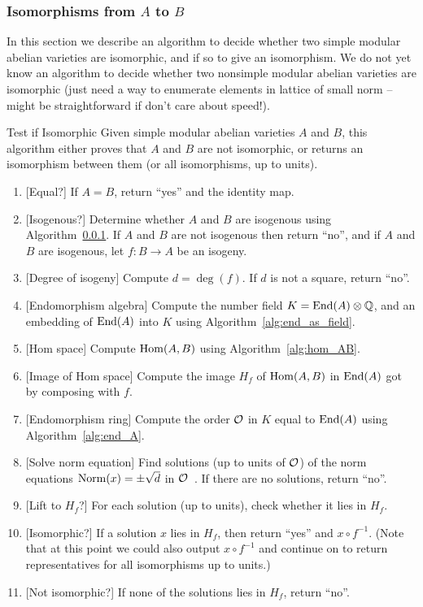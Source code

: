 \documentclass{article}
\begin{document}
\subsubsection{Isomorphisms from $A$ to $B$}

In this section we describe an algorithm to decide whether two simple
modular abelian varieties are isomorphic, and if so to give an
isomorphism.  We do not yet know an algorithm to decide whether two
nonsimple modular abelian varieties are isomorphic (just need a way
to enumerate elements in lattice of small norm -- might be straightforward
if don't care about speed!).


\begin{algorithm}{Test if Isomorphic}\label{alg:isom}
    Given simple modular abelian varieties $A$ and $B$,
    this algorithm either proves that $A$ and $B$ are not isomorphic,
    or returns an isomorphism between them (or all isomorphisms,
    up to units).

    \begin{enumerate}
        \item{}[Equal?] If $A=B$, return ``yes'' and the identity map.
        \item{}[Isogenous?]  Determine whether $A$ and $B$ are isogenous using Algorithm~\ref{}.
            If $A$ and $B$ are not isogenous then return ``no'', and if
            $A$ and $B$ are isogenous, let $f: B \to A$ be an isogeny.
        \item{}[Degree of isogeny]  Compute $d = \deg(f)$. If $d$ is not a square, return ``no''.
        \item{}[Endomorphism algebra]
            Compute the number field $K=\operatorname{End}(A)\otimes\mathbb{Q}$, and
            an embedding of $\operatorname{End}(A)$ into $K$ using
            Algorithm~\ref{alg:end_as_field}.
        \item{}[Hom space] Compute $\operatorname{Hom}(A,B)$ using Algorithm~\ref{alg:hom_AB}.
        \item{}[Image of Hom space]  Compute the image $H_f$ of $\operatorname{Hom}(A,B)$ in $\operatorname{End}(A)$
            got by composing with $f$.
        \item{}[Endomorphism ring] Compute the order $\mathcal{O}$ in $K$ equal to $\operatorname{End}(A)$
            using Algorithm~\ref{alg:end_A}.
        \item{}[Solve norm equation] Find solutions (up to units of $\mathcal{O}$) of the norm equations
            $\operatorname{Norm}(x) = \pm \sqrt{d}$ in $\mathcal{O}$~\cite[\S 5.3, 6.4]{MR1033013}. If there are no solutions, return ``no''.
        \item{}[Lift to $H_f$?]   For each solution (up to units), check whether it lies in $H_f$.
        \item{}[Isomorphic?]   If a solution $x$ lies in $H_f$, then return ``yes'' and $x\circ f^{-1}$.
            (Note that at this point we could also output $x\circ f^{-1}$ and continue
            on to return representatives for all isomorphisms up to units.)

        \item{}[Not isomorphic?]   If none of the solutions lies in $H_f$, return ``no''.
    \end{enumerate}
\end{algorithm}
\end{document}
